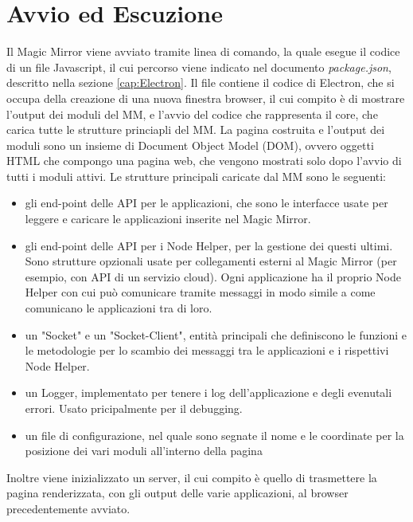 \section{Avvio ed Escuzione}
Il Magic Mirror viene avviato tramite linea di comando, la quale esegue
il codice di un file Javascript, il cui percorso viene indicato nel documento \textit{package.json}, descritto nella sezione \ref{cap:Electron}.
Il file contiene il codice di Electron, che si occupa della creazione di una nuova finestra browser, il cui compito
è di mostrare l'output dei moduli del MM, e l'avvio del codice che rappresenta il core, che carica tutte le strutture princiapli del MM.
La pagina costruita e l'output dei moduli sono un insieme di Document Object Model (DOM), ovvero oggetti HTML che compongo una pagina web, che vengono mostrati solo dopo l'avvio di tutti i moduli attivi.
Le strutture principali caricate dal MM sono le seguenti:
\begin{itemize}
\item gli end-point delle API per le applicazioni, che sono le interfacce usate per leggere e caricare le applicazioni inserite nel Magic Mirror.
\item gli end-point delle API per i Node Helper, per la gestione dei questi ultimi. Sono strutture opzionali usate per collegamenti
esterni al Magic Mirror (per esempio, con API di un servizio cloud). Ogni applicazione ha il proprio Node Helper con cui pu\`o comunicare tramite messaggi in modo
simile a come comunicano le applicazioni tra di loro.
\item un "Socket" e un "Socket-Client", entit\`a principali che definiscono le funzioni e le metodologie per lo scambio dei messaggi tra le applicazioni e i rispettivi Node Helper.
\item un Logger, implementato per tenere i log dell'applicazione e degli evenutali errori. Usato pricipalmente per il debugging.
\item un file di configurazione, nel quale sono segnate il nome e le coordinate per la posizione dei vari moduli
all'interno della pagina\\[2\baselineskip]
\end{itemize}
Inoltre viene inizializzato un server, il cui compito \`e quello di trasmettere la pagina renderizzata, con gli output delle varie applicazioni,
al browser precedentemente avviato.

